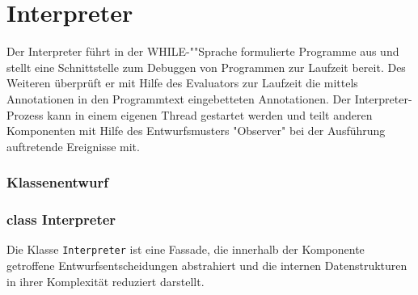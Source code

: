 \section{Interpreter}

Der Interpreter führt in der WHILE-""Sprache formulierte Programme aus und stellt eine Schnittstelle zum Debuggen von Programmen zur Laufzeit bereit. Des Weiteren überprüft er mit Hilfe des Evaluators zur Laufzeit die mittels Annotationen in den Programmtext eingebetteten Annotationen. Der Interpreter-Prozess kann in einem eigenen Thread gestartet werden und teilt anderen Komponenten mit Hilfe des Entwurfsmusters "Observer" bei der Ausführung auftretende Ereignisse mit.

\subsubsection{Klassenentwurf}

\subsubsection{class Interpreter}
Die Klasse \texttt{Interpreter} ist eine Fassade, die innerhalb der Komponente getroffene Entwurfsentscheidungen abstrahiert und die internen Datenstrukturen in ihrer Komplexität reduziert darstellt.


